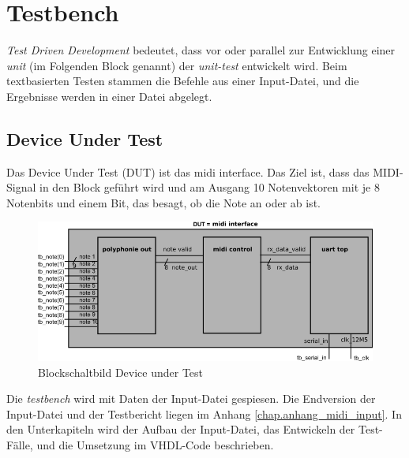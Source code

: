 
\chapter{Testbench}\label{chap.testen}
 \textit{Test Driven Development} bedeutet, dass vor oder parallel zur Entwicklung einer \textit{unit} (im Folgenden Block genannt) der \textit{unit-test} entwickelt wird\cite{Testdriven}. Beim textbasierten Testen stammen die Befehle aus einer Input-Datei, und die Ergebnisse werden in einer Datei abgelegt. 

\section{Device Under Test}\label{sec.testbench_DUT}
Das Device Under Test (DUT)  ist das midi interface. Das Ziel ist, dass das MIDI-Signal in den Block geführt wird und am Ausgang 10 Notenvektoren mit je 8 Notenbits und einem Bit, das besagt, ob die Note an oder ab ist.\\
\begin{figure}[H]
	\centering
	\includegraphics[width=1\textwidth]{images/midi_interface/testbench_midiinterface.png}
	\caption{Blockschaltbild Device under Test}
	\label{fig.testbench}
\end{figure} 

Die \textit{testbench} wird mit Daten der Input-Datei gespiesen. Die Endversion der Input-Datei und der Testbericht liegen im Anhang \ref{chap.anhang_midi_input}. 
In den Unterkapiteln wird der Aufbau der Input-Datei, das Entwickeln der Test-Fälle, und die Umsetzung im VHDL-Code beschrieben.


